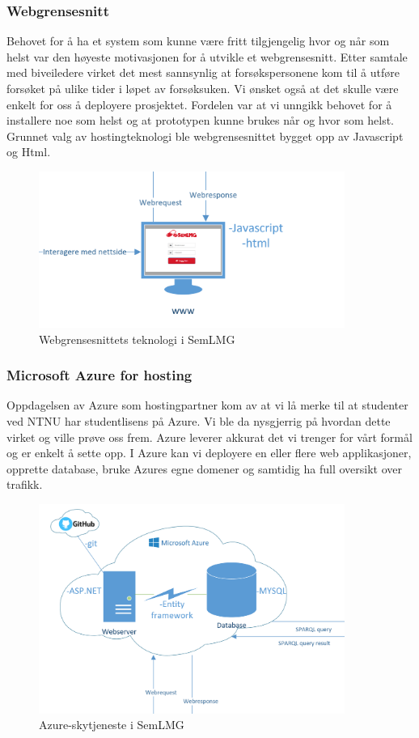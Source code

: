 \subsubsection{Webgrensesnitt}

Behovet for å ha et system som kunne være fritt tilgjengelig hvor og når som helst var den høyeste motivasjonen for å utvikle et webgrensesnitt. Etter samtale med biveiledere virket det mest sannsynlig at forsøkspersonene kom til å utføre forsøket på ulike tider i løpet av forsøksuken. Vi ønsket også at det skulle være enkelt for oss å deployere prosjektet. Fordelen var at vi unngikk behovet for å installere noe som helst og at prototypen kunne brukes når og hvor som helst. Grunnet valg av hostingteknologi ble webgrensesnittet bygget opp av Javascript og Html.
\begin{figure}[H]
\centering
\includegraphics[width=10cm]{images/www}
\caption{Webgrensesnittets teknologi i SemLMG}
\label{fig:webui}
\end{figure}

\subsubsection{Microsoft Azure for hosting}
Oppdagelsen av Azure som hostingpartner kom av at vi lå merke til at studenter ved NTNU har studentlisens på Azure. Vi ble da nysgjerrig på hvordan dette virket og ville prøve oss frem. Azure leverer akkurat det vi trenger for vårt formål og er enkelt å sette opp. I Azure kan vi deployere en eller flere web applikasjoner, opprette database, bruke Azures egne domener og samtidig ha full oversikt over trafikk.
\begin{figure}[H]
\centering
\includegraphics[width=10cm]{images/sky}
\caption{Azure-skytjeneste i SemLMG}
\label{fig:sky}
\end{figure}
